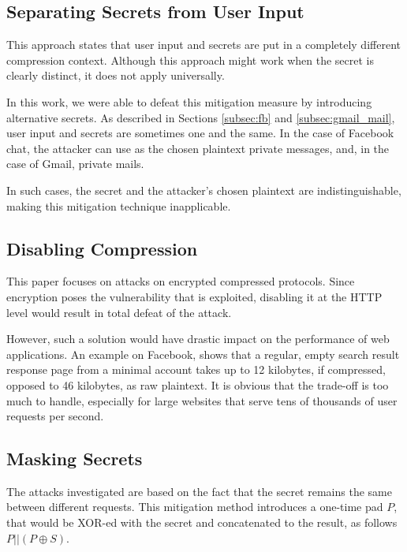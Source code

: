 \subsection{Separating Secrets from User Input}\label{subsec:sep_compression}

This approach states that user input and secrets are put in a completely
different compression context. Although this approach might work when the secret
is clearly distinct, it does not apply universally.

In this work, we were able to defeat this mitigation measure by introducing
alternative secrets. As described in Sections \ref{subsec:fb} and
\ref{subsec:gmail_mail}, user input and secrets are sometimes one and the same.
In the case of Facebook chat, the attacker can use as the chosen plaintext
private messages, and, in the case of Gmail, private mails.

In such cases, the secret and the attacker's chosen plaintext are
indistinguishable, making this mitigation technique inapplicable.

\subsection{Disabling Compression}

This paper focuses on attacks on encrypted compressed protocols. Since
encryption poses the vulnerability that is exploited, disabling it at the HTTP
level would result in total defeat of the attack.

However, such a solution would have drastic impact on the performance of web
applications. An example on Facebook, shows that a regular, empty search result
response page from a minimal account takes up to 12 kilobytes, if compressed,
opposed to 46 kilobytes, as raw plaintext. It is obvious that the trade-off is
too much to handle, especially for large websites that serve tens of thousands
of user requests per second.

\subsection{Masking Secrets}

The attacks investigated are based on the fact that the secret remains the same
between different requests. This mitigation method introduces a one-time pad
\begin{math}P\end{math}, that would be XOR-ed with the secret and concatenated
to the result, as follows \begin{math}P||(P \oplus S)\end{math}.


